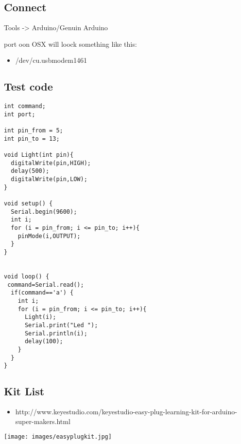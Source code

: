 \subsection{Connect}

Tools -\textgreater{} Arduino/Genuin Arduino

port oon OSX will loock something like this:

\begin{itemize}
\item
  /dev/cu.usbmodem1461
\end{itemize}

\subsection{Test code}

\begin{lstlisting}
int command;
int port;

int pin_from = 5;
int pin_to = 13;

void Light(int pin){
  digitalWrite(pin,HIGH);
  delay(500);
  digitalWrite(pin,LOW);
}

void setup() {
  Serial.begin(9600);
  int i;
  for (i = pin_from; i <= pin_to; i++){
    pinMode(i,OUTPUT);
  }
}


void loop() {
 command=Serial.read();
  if(command=='a') {
    int i;
    for (i = pin_from; i <= pin_to; i++){
      Light(i);    
      Serial.print("Led ");
      Serial.println(i);
      delay(100);
    }
  }
}
\end{lstlisting}

\subsection{Kit List}

\begin{itemize}
\item
  http://www.keyestudio.com/keyestudio-easy-plug-learning-kit-for-arduino-super-makers.html
\end{itemize}

\texttt{[image: images/easyplugkit.jpg]}

